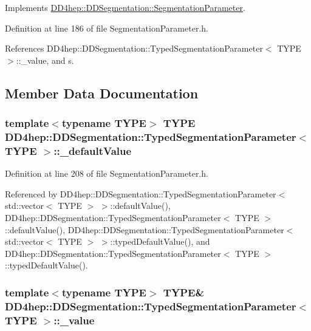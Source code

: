 Implements \hyperlink{class_d_d4hep_1_1_d_d_segmentation_1_1_segmentation_parameter_a633dffe9e53306c5f67568ff5e567387}{DD4hep::DDSegmentation::SegmentationParameter}.

Definition at line 186 of file SegmentationParameter.h.

References DD4hep::DDSegmentation::TypedSegmentationParameter$<$ TYPE $>$::\_\-value, and s.

\subsection{Member Data Documentation}
\hypertarget{class_d_d4hep_1_1_d_d_segmentation_1_1_typed_segmentation_parameter_a91a6da96caf97f4c01828b98812d3e7f}{
\subsubsection[{\_\-defaultValue}]{\setlength{\rightskip}{0pt plus 5cm}template$<$typename TYPE$>$ TYPE {\bf DD4hep::DDSegmentation::TypedSegmentationParameter}$<$ TYPE $>$::{\bf \_\-defaultValue}}}
\label{class_d_d4hep_1_1_d_d_segmentation_1_1_typed_segmentation_parameter_a91a6da96caf97f4c01828b98812d3e7f}


Definition at line 208 of file SegmentationParameter.h.

Referenced by DD4hep::DDSegmentation::TypedSegmentationParameter$<$ std::vector$<$ TYPE $>$ $>$::defaultValue(), DD4hep::DDSegmentation::TypedSegmentationParameter$<$ TYPE $>$::defaultValue(), DD4hep::DDSegmentation::TypedSegmentationParameter$<$ std::vector$<$ TYPE $>$ $>$::typedDefaultValue(), and DD4hep::DDSegmentation::TypedSegmentationParameter$<$ TYPE $>$::typedDefaultValue().\hypertarget{class_d_d4hep_1_1_d_d_segmentation_1_1_typed_segmentation_parameter_af22eb54e9ee1571cf874c2c05c641603}{
\subsubsection[{\_\-value}]{\setlength{\rightskip}{0pt plus 5cm}template$<$typename TYPE$>$ TYPE\& {\bf DD4hep::DDSegmentation::TypedSegmentationParameter}$<$ TYPE $>$::{\bf \_\-value}}}
\label{class_d_d4hep_1_1_d_d_segmentation_1_1_typed_segmentation_parameter_af22eb54e9ee1571cf874c2c05c641603}


